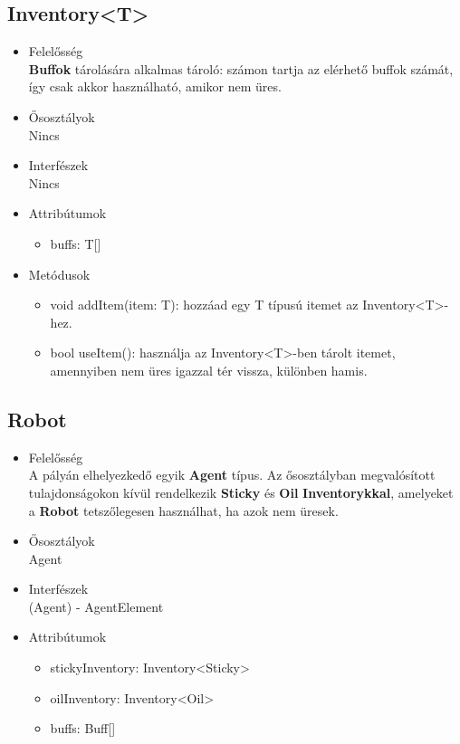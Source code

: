 \subsection{Inventory<T>}
\begin{itemize}

\item Felelősség\\
    \textbf{Buffok} tárolására alkalmas tároló: számon tartja az elérhető buffok számát, így csak akkor használható, amikor nem üres.

\item Ősosztályok\\
Nincs

\item Interfészek\\
Nincs

\item Attribútumok\\
\begin{itemize}
    \item buffs: T[]
\end{itemize}

\item Metódusok\\

\begin{itemize}
    \item void addItem(item: T): hozzáad egy T típusú itemet az Inventory<T>-hez.
    \item bool useItem(): használja az Inventory<T>-ben tárolt itemet, amennyiben nem üres igazzal tér vissza, különben hamis.
\end{itemize}

\end{itemize}

\subsection{Robot}
\begin{itemize}

\item Felelősség\\
    A pályán elhelyezkedő egyik \textbf{Agent} típus. Az ősosztályban megvalósított tulajdonságokon kívül rendelkezik \textbf{Sticky} és \textbf{Oil} \textbf{Inventorykkal}, amelyeket a \textbf{Robot} tetszőlegesen használhat, ha azok nem üresek.

\item Ősosztályok\\
Agent

\item Interfészek\\
(Agent) - AgentElement

\item Attribútumok\\
\begin{itemize}
    \item stickyInventory: Inventory<Sticky>
    \item oilInventory: Inventory<Oil>
    \item buffs: Buff[]
\end{itemize}
\end{itemize}

